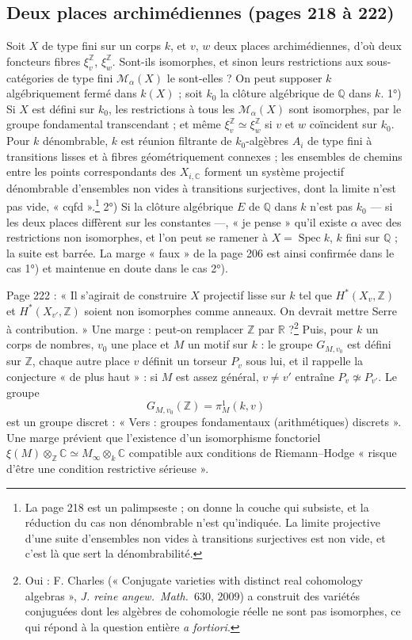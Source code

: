 \documentclass[11pt,a4paper]{article}
\begin{document}
\subsection*{Deux places archimédiennes (pages 218 à 222)}

Soit $X$ de type fini sur un corps $k$, et $v$, $w$ deux places archimédiennes,
d'où deux foncteurs fibres $\xi_{v}^{\mathbb{Z}}$, $\xi_{w}^{\mathbb{Z}}$.
Sont-ils isomorphes, et sinon leurs restrictions aux sous-catégories de type fini
$\mathcal{M}_{\alpha}(X)$ le sont-elles ? On peut supposer $k$ algébriquement
fermé dans $k(X)$ ; soit $k_{0}$ la clôture algébrique de $\mathbb{Q}$ dans $k$.
1°) Si $X$ est défini sur $k_{0}$, les restrictions à tous les
$\mathcal{M}_{\alpha}(X)$ sont isomorphes, par le groupe fondamental
transcendant ; et même $\xi_{v}^{\mathbb{Z}} \simeq \xi_{w}^{\mathbb{Z}}$ si $v$ et
$w$ coïncident sur $k_{0}$. Pour $k$ dénombrable, $k$ est réunion filtrante de
$k_{0}$-algèbres $A_{i}$ de type fini à transitions lisses et à fibres
géométriquement connexes ; les ensembles de chemins entre les points
correspondants des $X_{i,\mathbb{C}}$ forment un système projectif dénombrable
d'ensembles non vides à transitions surjectives, dont la limite n'est pas vide,
« cqfd ».\footnote{La page 218 est un palimpseste ; on donne la couche qui
subsiste, et la réduction du cas non dénombrable n'est qu'indiquée. La limite
projective d'une suite d'ensembles non vides à transitions surjectives est non
vide, et c'est là que sert la dénombrabilité.} 2°) Si la clôture algébrique $E$
de $\mathbb{Q}$ dans $k$ n'est pas $k_{0}$ --- si les deux places diffèrent sur
les constantes ---, « je pense » qu'il existe $\alpha$ avec des restrictions non
isomorphes, et l'on peut se ramener à $X = \operatorname{Spec} k$, $k$ fini sur
$\mathbb{Q}$ ; la suite est barrée. La marge « faux » de la page 206 est ainsi
confirmée dans le cas 1°) et maintenue en doute dans le cas 2°).

Page 222 : « Il s'agirait de construire $X$ projectif lisse sur $k$ tel que
$H^{*}(X_{v}, \mathbb{Z})$ et $H^{*}(X_{v'}, \mathbb{Z})$ soient non isomorphes
comme anneaux. On devrait mettre Serre à contribution. » Une marge : peut-on
remplacer $\mathbb{Z}$ par $\mathbb{R}$ ?\footnote{Oui : F. Charles
(« Conjugate varieties with distinct real cohomology algebras », \emph{J. reine
angew.\ Math.}\ 630, 2009) a construit des variétés conjuguées dont les algèbres
de cohomologie réelle ne sont pas isomorphes, ce qui répond à la question
entière \emph{a fortiori}.} Puis, pour $k$ un corps de nombres, $v_{0}$ une
place et $M$ un motif sur $k$ : le groupe $G_{M,v_{0}}$ est défini sur
$\mathbb{Z}$, chaque autre place $v$ définit un torseur $P_{v}$ sous lui, et il
rappelle la conjecture « de plus haut » : si $M$ est assez général, $v \neq v'$
entraîne $P_{v} \not\simeq P_{v'}$. Le groupe
\[
  G_{M,v_{0}}(\mathbb{Z}) = \pi^{1}_{M}(k, v)
\]
est un groupe discret : « Vers : groupes fondamentaux (arithmétiques) discrets
». Une marge prévient que l'existence d'un isomorphisme fonctoriel $\xi(M)
\otimes_{\mathbb{Z}} \mathbb{C} \simeq M_{\infty} \otimes_{k} \mathbb{C}$
compatible aux conditions de Riemann--Hodge « risque d'être une condition
restrictive sérieuse ».
\end{document}
